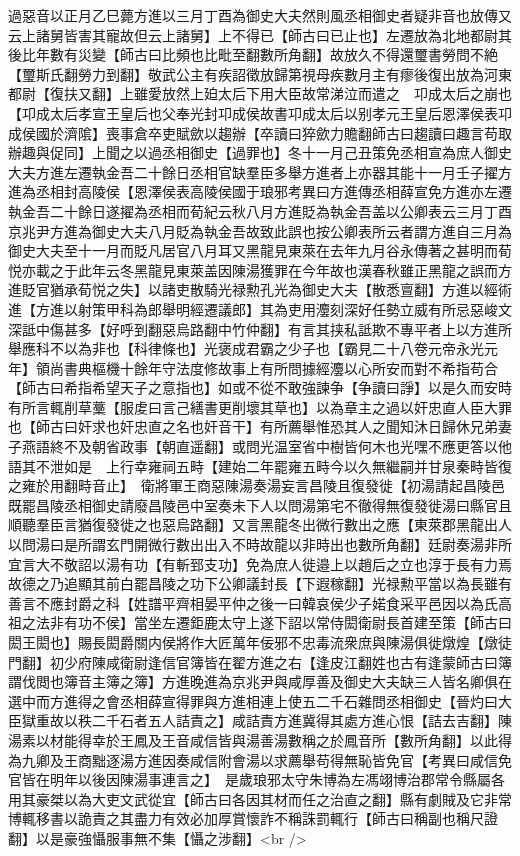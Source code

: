 過惡音以正月乙巳薨方進以三月丁酉為御史大夫然則風丞相御史者疑非音也放傳又云上諸舅皆害其寵故但云上諸舅】上不得已【師古曰已止也】左遷放為北地都尉其後比年數有災變【師古曰比頻也比毗至翻數所角翻】故放久不得還璽書勞問不絶【璽斯氏翻勞力到翻】敬武公主有疾詔徵放歸第視母疾數月主有瘳後復出放為河東都尉【復扶又翻】上雖愛放然上廹太后下用大臣故常涕泣而遣之　卭成太后之崩也【卭成太后孝宣王皇后也父奉光封卭成侯故書卭成太后以别孝元王皇后恩澤侯表卭成侯國於濟隂】喪事倉卒吏賦歛以趨辦【卒讀曰猝歛力贍翻師古曰趨讀曰趣言苟取辦趣與促同】上聞之以過丞相御史【過罪也】冬十一月己丑策免丞相宣為庶人御史大夫方進左遷執金吾二十餘日丞相官缺羣臣多舉方進者上亦器其能十一月壬子擢方進為丞相封高陵侯【恩澤侯表高陵侯國于琅邪考異曰方進傳丞相薛宣免方進亦左遷執金吾二十餘日遂擢為丞相而荀紀云秋八月方進貶為執金吾盖以公卿表云三月丁酉京兆尹方進為御史大夫八月貶為執金吾故致此誤也按公卿表所云者謂方進自三月為御史大夫至十一月而貶凡居官八月耳又黑龍見東萊在去年九月谷永傳著之甚明而荀悦亦載之于此年云冬黑龍見東萊盖因陳湯獲罪在今年故也漢春秋雖正黑龍之誤而方進貶官猶承荀悦之失】以諸吏散騎光禄勲孔光為御史大夫【散悉亶翻】方進以經術進【方進以射策甲科為郎舉明經遷議郎】其為吏用灋刻深好任勢立威有所忌惡峻文深詆中傷甚多【好呼到翻惡烏路翻中竹仲翻】有言其挟私詆欺不專平者上以方進所舉應科不以為非也【科律條也】光褒成君霸之少子也【霸見二十八卷元帝永光元年】領尚書典樞機十餘年守法度修故事上有所問據經灋以心所安而對不希指苟合【師古曰希指希望天子之意指也】如或不從不敢強諫争【争讀曰諍】以是久而安時有所言輒削草藳【服䖍曰言己繕書更削壞其草也】以為章主之過以奸忠直人臣大罪也【師古曰奸求也奸忠直之名也奸音干】有所薦舉惟恐其人之聞知沐日歸休兄弟妻子燕語終不及朝省政事【朝直遥翻】或問光温室省中樹皆何木也光嘿不應更答以他語其不泄如是　上行幸雍祠五畤【建始二年罷雍五畤今以久無繼嗣并甘泉秦畤皆復之雍於用翻畤音止】　衛將軍王商惡陳湯奏湯妄言昌陵且復發徙【初湯請起昌陵邑既罷昌陵丞相御史請廢昌陵邑中室奏未下人以問湯第宅不徹得無復發徙湯曰縣官且順聽羣臣言猶復發徙之也惡烏路翻】又言黑龍冬出微行數出之應【東萊郡黑龍出人以問湯曰是所謂玄門開微行數出出入不時故龍以非時出也數所角翻】廷尉奏湯非所宜言大不敬詔以湯有功【有斬郅支功】免為庶人徙邉上以趙后之立也淳于長有力焉故德之乃追顯其前白罷昌陵之功下公卿議封長【下遐稼翻】光禄勲平當以為長雖有善言不應封爵之科【姓譜平齊相晏平仲之後一曰韓哀侯少子婼食采平邑因以為氏高祖之法非有功不侯】當坐左遷鉅鹿太守上遂下詔以常侍閎衛尉長首建至策【師古曰閎王閎也】賜長閎爵關内侯將作大匠萬年佞邪不忠毒流衆庶與陳湯俱徙燉煌【燉徒門翻】初少府陳咸衛尉逢信官簿皆在翟方進之右【逢皮江翻姓也古有逢蒙師古曰簿謂伐閲也簿音主簿之簿】方進晚進為京兆尹與咸厚善及御史大夫缺三人皆名卿俱在選中而方進得之會丞相薛宣得罪與方進相連上使五二千石雜問丞相御史【晉灼曰大臣獄重故以秩二千石者五人詰責之】咸詰責方進冀得其處方進心恨【詰去吉翻】陳湯素以材能得幸於王鳳及王音咸信皆與湯善湯數稱之於鳳音所【數所角翻】以此得為九卿及王商黜逐湯方進因奏咸信附會湯以求薦舉苟得無恥皆免官【考異曰咸信免官皆在明年以後因陳湯事連言之】　是歲琅邪太守朱博為左馮翊博治郡常令縣屬各用其豪桀以為大吏文武從宜【師古曰各因其材而任之治直之翻】縣有劇賊及它非常博輒移書以詭責之其盡力有效必加厚賞懷詐不稱誅罰輒行【師古曰稱副也稱尺證翻】以是豪強懾服事無不集【懾之涉翻】<br />
